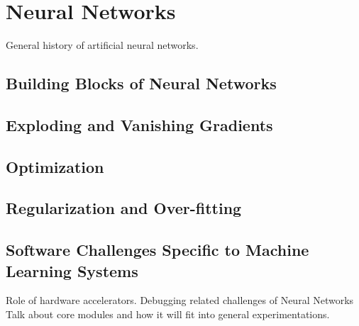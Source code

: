 \chapter{Neural Networks}
General history of artificial neural networks.

\section{Building Blocks of Neural Networks}

\section{Exploding and Vanishing Gradients}

\section{Optimization}

\section{Regularization and Over-fitting}

\section{Software Challenges Specific to 
Machine Learning Systems} \label{sec:engchallenge}
Role of hardware accelerators. Debugging related challenges of Neural Networks
Talk about core modules and how it will fit into general experimentations. 
\clearpage